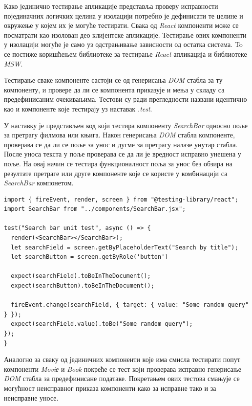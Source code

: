 \documentclass[12pt,oneside]{memoir}
\begin{document}
Како јединично тестирање апликације представља проверу исправности појединачних логичких целина у изолацији потребно је дефинисати те целине и окружење у којем их је могуће тестирати. Свака од \textit{React} компоненти може се посматрати као изолован део клијентске апликације. Тестирање ових компоненти у изолацији могуће је само уз одстрањивање зависности од остатка система. To се постиже коришћењем библиотеке за тестирање \textit{React} апликација и библиотеке \textit{MSW}.

Тестирање сваке компоненте састоји се од генерисања \textit{DOM} стабла за ту компоненту, и провере да ли се компонента приказује и мења у складу са предефинисаним очекивањима. Тестови су ради прегледности названи идентично као и компоненте које тестирају уз наставак \textit{.test}. 

У наставку је представљен код који тестира компоненту \textit{SearchBar} односно поље за претрагу филмова или књига. Након генерисања \textit{DOM} стабла компоненте, проверава се да ли се поље за унос и дугме за претрагу налазе унутар стабла. После уноса текста у поље проверава се да ли је вредност исправно унешена у поље. На овај начин се тестира функционалност поља за унос без обзира на резултате претраге или друге компоненте које се користе у комбинацији са \textit{SearchBar} компонетом.

\begin{lstlisting}[caption=Јединично тестирање \textit{SearchBar} компоненте, 
basicstyle=\tiny,
label={lst:searchbarTest},
frame=single]
import { fireEvent, render, screen } from "@testing-library/react";
import SearchBar from "../components/SearchBar.jsx";

test("Search bar unit test", async () => {
  render(<SearchBar></SearchBar>);
  let searchField = screen.getByPlaceholderText("Search by title");
  let searchButton = screen.getByRole('button')
  
  expect(searchField).toBeInTheDocument();
  expect(searchButton).toBeInTheDocument();

  fireEvent.change(searchField, { target: { value: "Some random query" } });
  expect(searchField.value).toBe("Some random query");
});
}
\end{lstlisting}

Аналогно за сваку од јединичних компоненти које има смисла тестирати попут компоненти \textit{Moviе} и \textit{Book} покреће се тест који проверава исправно генерисање \textit{DOM} стабла за предефинисане податаке. Покретањем ових тестова смањује се могућност неисправног приказа компоненти како за исправне тако и за неисправне уносе.
 
\end{document}
